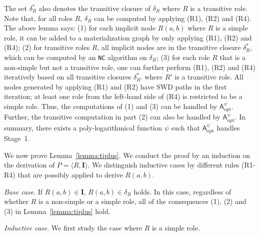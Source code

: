 The set $\delta^*_R$ also denotes the transitive closure of $\delta_R$ where $R$ is a transitive role.
Note that, for all roles $R$, $\delta_R$ can be computed by applying (R1), (R2) and (R4).
The above lemma says:
(1) for each implicit node $R(a,b)$ where $R$ is a simple role,
it can be added to a materialization graph by only applying (R1), (R2) and (R4);
(2) for transitive roles $R$, all implicit nodes are in the transitive closure $\delta^*_{R}$,
which can be computed by an \texttt{NC} algorithm on $\delta_{R}$;
(3) for each role $R$ that is a non-simple but not a transitive role,
one can further perform (R1), (R2) and (R4) iteratively based on all
transitive closures $\delta^*_{R'}$ where $R'$ is a transitive role.
All nodes generated by applying (R1) and (R2) have SWD paths in the first iteration; at
least one role from the left-hand side of (R4) is restricted to be a simple role.
Thus, the computations of (1) and (3) can be handled by $\mathsf{A}_{\text{opt}}^\psi$.
Further, the transitive computation in part (2) can also be handled by $\mathsf{A}_{\text{opt}}^\psi$.
In summary, there exists a poly-logarithmical function $\psi$
such that $\mathsf{A}_{\text{opt}}^\psi$ handles Stage~1.

We now prove Lemma~\ref{lemma:tiplus}.
We conduct the proof by an induction on
the derivation of $P=\langle R,\textbf{I}\rangle$. We distinguish inductive cases by different rules (R1-R4)
that are possibly applied to derive $R(a,b)$.

\emph{Base case}. If $R(a,b)\in\textbf{I}$, $R(a,b)\in\delta_{R}$ holds. In this case,
regardless of whether $R$ is a non-simple or a simple role, all of
the consequences (1), (2) and (3) in Lemma~\ref{lemma:tiplus} hold.

\emph{Inductive case}. We first study the case where $R$ is a simple role.

